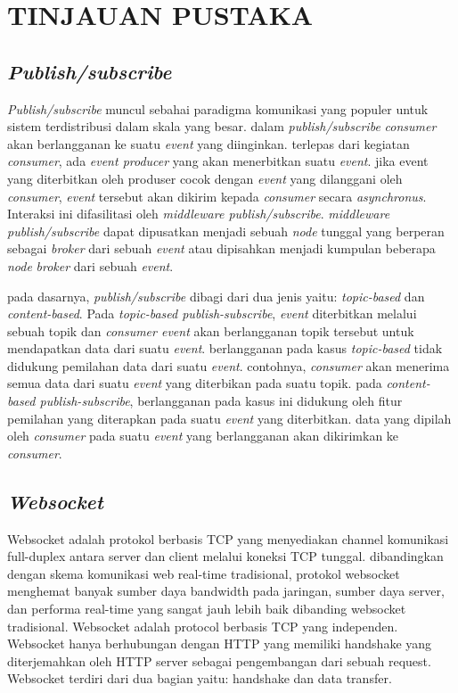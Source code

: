 \chapter{TINJAUAN PUSTAKA}
		\section{\textit{Publish/subscribe}}
			\textit{Publish/subscribe} muncul sebahai paradigma komunikasi yang populer untuk sistem terdistribusi dalam skala yang besar. dalam \textit{publish/subscribe} \textit{consumer} akan berlangganan ke suatu \textit{event} yang diinginkan. terlepas dari kegiatan \textit{consumer}, ada \textit{event producer} yang akan menerbitkan suatu \textit{event}. jika event yang diterbitkan oleh produser cocok dengan \textit{event} yang dilanggani oleh \textit{consumer}, \textit{event} tersebut akan dikirim kepada \textit{consumer} secara \textit{asynchronus}. Interaksi ini difasilitasi oleh \textit{middleware publish/subscribe}. \textit{middleware publish/subscribe} dapat dipusatkan menjadi sebuah \textit{node} tunggal yang berperan sebagai \textit{broker} dari sebuah \textit{event} atau dipisahkan menjadi kumpulan beberapa \textit{node} \textit{broker} dari sebuah \textit{event}. 
			
			pada dasarnya, \textit{publish/subscribe} dibagi dari dua jenis yaitu: \textit{topic-based} dan \textit{content-based}. Pada \textit{topic-based publish-subscribe}, \textit{event} diterbitkan melalui sebuah topik dan \textit{consumer event} akan berlangganan topik tersebut untuk mendapatkan data dari suatu \textit{event}. berlangganan pada kasus \textit{topic-based} tidak didukung pemilahan data dari suatu \textit{event}. contohnya, \textit{consumer} akan menerima semua data dari suatu \textit{event} yang diterbikan pada suatu topik. pada \textit{content-based publish-subscribe}, berlangganan pada kasus ini didukung oleh fitur pemilahan yang diterapkan pada suatu \textit{event} yang diterbitkan. data yang dipilah oleh \textit{consumer} pada suatu \textit{event} yang berlangganan akan dikirimkan ke \textit{consumer}. \cite{noauthor_what_2016}
			
		\section{\textit{Websocket}}
          	Websocket adalah protokol berbasis TCP yang menyediakan channel komunikasi full-duplex antara server dan client melalui koneksi TCP tunggal. dibandingkan dengan skema komunikasi web real-time tradisional, protokol websocket menghemat banyak sumber daya bandwidth pada jaringan, sumber daya server, dan performa real-time yang sangat jauh lebih baik dibanding websocket tradisional. Websocket adalah protocol berbasis TCP yang independen. Websocket hanya berhubungan dengan HTTP yang memiliki handshake yang diterjemahkan oleh HTTP server sebagai pengembangan dari sebuah request. Websocket terdiri dari dua bagian yaitu: handshake dan data transfer.
           		
